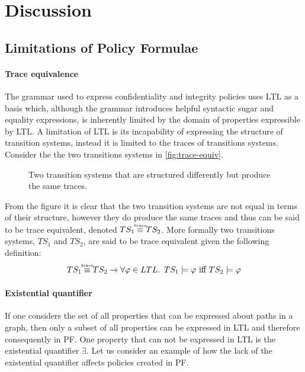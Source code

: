 \section{Discussion}\label{sec:discussion}
\subsection{Limitations of Policy Formulae}\label{sec:limitations}
\paragraph{Trace equivalence}
The grammar used to express confidentiality and integrity policies uses LTL as a basis which, although the grammar introduces helpful syntactic sugar and equality expressions, is inherently limited by the domain of properties expressible by LTL. A limitation of LTL is its incapability of expressing the structure of transition systems, instead it is limited to the traces of transitions systems. Consider the the two transitions systems in \autoref{fig:trace-equiv}.
\begin{figure}[!ht]
    \centering
    
    \caption{Two transition systems that are structured differently but produce the same traces.}
    \label{fig:trace-equiv}
\end{figure}
From the figure it is clear that the two transition systems are not equal in terms of their structure, however they do produce the same traces and thus can be said to be trace equivalent, denoted $TS_1 \equivt TS_2$. More formally two transitions systems, $TS_1$ and $TS_2$, are said to be trace equivalent given the following definition:
\begin{align*}
    TS_1 \equivt TS_2 \rightarrow \forall \phi \in LTL .\enskip TS_1 \models \phi \text{ iff } TS_2 \models \phi
\end{align*}

\paragraph{Existential quantifier} If one considers the set of all properties that can be expressed about paths in a graph, then only a subset of all properties can be expressed in LTL and therefore consequently in PF. One property that can not be expressed in LTL is the existential quantifier $\exists$. Let us consider an example of how the lack of the existential quantifier affects policies created in PF.

